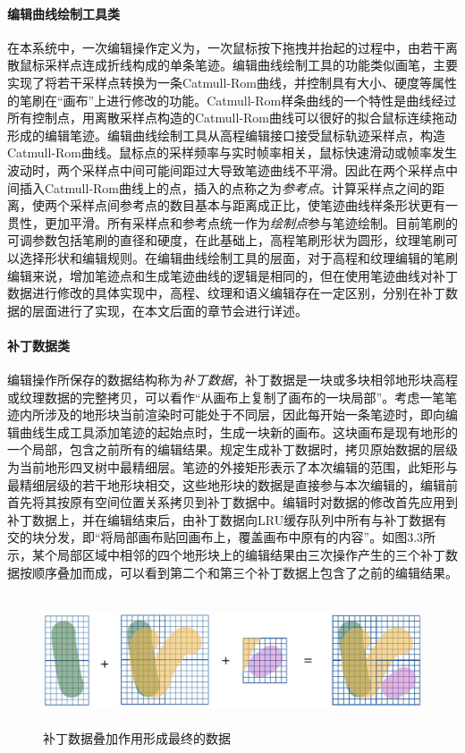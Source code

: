 \paragraph{编辑曲线绘制工具类}
在本系统中，一次编辑操作定义为，一次鼠标按下拖拽并抬起的过程中，由若干离散鼠标采样点连成折线构成的单条笔迹。编辑曲线绘制工具的功能类似画笔，主要实现了将若干采样点转换为一条Catmull-Rom曲线，并控制具有大小、硬度等属性的笔刷在“画布”上进行修改的功能。Catmull-Rom样条曲线的一个特性是曲线经过所有控制点\supercite{catmull-rom}，用离散采样点构造的Catmull-Rom曲线可以很好的拟合鼠标连续拖动形成的编辑笔迹。编辑曲线绘制工具从高程编辑接口接受鼠标轨迹采样点，构造Catmull-Rom曲线。鼠标点的采样频率与实时帧率相关，鼠标快速滑动或帧率发生波动时，两个采样点中间可能间距过大导致笔迹曲线不平滑。因此在两个采样点中间插入Catmull-Rom曲线上的点，插入的点称之为\textit{参考点}。计算采样点之间的距离，使两个采样点间参考点的数目基本与距离成正比，使笔迹曲线样条形状更有一贯性，更加平滑。所有采样点和参考点统一作为\textit{绘制点}参与笔迹绘制。目前笔刷的可调参数包括笔刷的直径和硬度，在此基础上，高程笔刷形状为圆形，纹理笔刷可以选择形状和编辑规则。在编辑曲线绘制工具的层面，对于高程和纹理编辑的笔刷编辑来说，增加笔迹点和生成笔迹曲线的逻辑是相同的，但在使用笔迹曲线对补丁数据进行修改的具体实现中，高程、纹理和语义编辑存在一定区别，分别在补丁数据的层面进行了实现，在本文后面的章节会进行详述。\par
\paragraph{补丁数据类}
编辑操作所保存的数据结构称为\textit{补丁数据}，补丁数据是一块或多块相邻地形块高程或纹理数据的完整拷贝，可以看作“从画布上复制了画布的一块局部”。考虑一笔笔迹内所涉及的地形块当前渲染时可能处于不同层，因此每开始一条笔迹时，即向编辑曲线生成工具添加笔迹的起始点时，生成一块新的画布。这块画布是现有地形的一个局部，包含之前所有的编辑结果。规定生成补丁数据时，拷贝原始数据的层级为当前地形四叉树中最精细层。笔迹的外接矩形表示了本次编辑的范围，此矩形与最精细层级的若干地形块相交，这些地形块的数据是直接参与本次编辑的，编辑前首先将其按原有空间位置关系拷贝到补丁数据中。编辑时对数据的修改首先应用到补丁数据上，并在编辑结束后，由补丁数据向LRU缓存队列中所有与补丁数据有交的块分发，即“将局部画布贴回画布上，覆盖画布中原有的内容”。如图3.3所示，某个局部区域中相邻的四个地形块上的编辑结果由三次操作产生的三个补丁数据按顺序叠加而成，可以看到第二个和第三个补丁数据上包含了之前的编辑结果。\par

\begin{figure}[htbp]
\centering
\includegraphics[height=3.9cm,width=14.8cm]{figures/mergeData.jpg}
\caption{补丁数据叠加作用形成最终的数据}
\end{figure}

